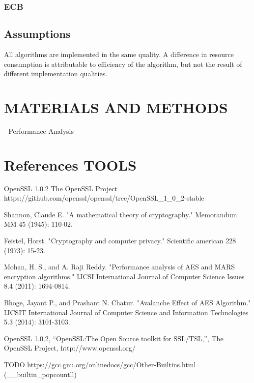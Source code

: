 \documentclass[11pt]{scrartcl}
\begin{document}
\subsubsection{ECB}

\subsection{Assumptions}
All algorithms are implemented in the same quality. A difference in resource consumption is attributable to efficiency of the algorithm, but not the result of different implementation qualities.

\section{MATERIALS AND METHODS}

- Performance Analysis



\section{References TOOLS}

OpenSSL 1.0.2
The OpenSSL Project
https://github.com/openssl/openssl/tree/OpenSSL_1_0_2-stable





\begin{thebibliography}{laengste Labelbreite}

   Shannon, Claude E. "A mathematical theory of cryptography." Memorandum MM 45 (1945): 110-02.
  
   Feistel, Horst. "Cryptography and computer privacy." Scientific american 228 (1973): 15-23.
   
  Mohan, H. S., and A. Raji Reddy. "Performance analysis of AES and MARS encryption algorithms." IJCSI International Journal of Computer Science Issues 8.4 (2011): 1694-0814.
  
    Bhoge, Jayant P., and Prashant N. Chatur. "Avalanche Effect of AES Algorithm." IJCSIT International Journal of Computer Science and Information Technologies 5.3 (2014): 3101-3103.

   OpenSSL 1.0.2, “OpenSSL:The Open Source toolkit for SSL/TSL,”, The OpenSSL Project, http://www.openssl.org/

  TODO
  https://gcc.gnu.org/onlinedocs/gcc/Other-Builtins.html (__builtin_popcountll)
\end{thebibliography}
\end{document}

